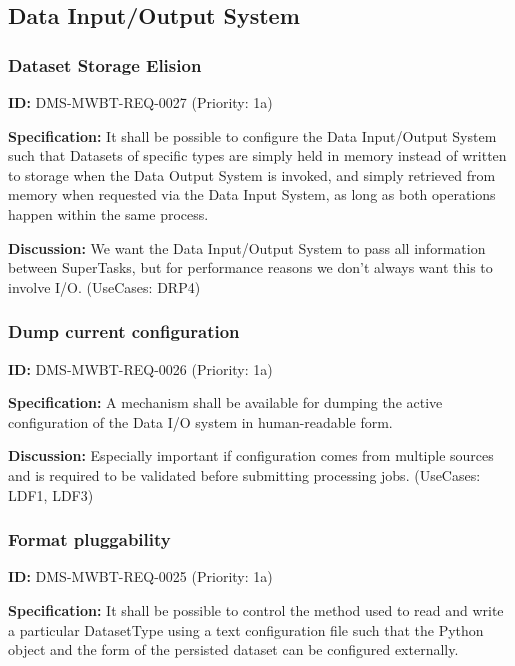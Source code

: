 \documentclass[SE,toc,lsstdraft]{lsstdoc}
\begin{document}
\subsection{Data Input/Output System}

\subsubsection{Dataset Storage Elision}

\label{DMS-MWBT-REQ-0027}
\textbf{ID:} DMS-MWBT-REQ-0027 (Priority: 1a)

\textbf{Specification:}
It shall be possible to configure the Data Input/Output System such that Datasets of specific types are simply held in memory instead of written to storage when the Data Output System is invoked, and simply retrieved from memory when requested via the Data Input System, as long as both operations happen within the same process.

\textbf{Discussion:}
We want the Data Input/Output System to pass all information between SuperTasks, but for performance reasons we don't always want this to involve I/O. (UseCases: DRP4)

\subsubsection{Dump current configuration}

\label{DMS-MWBT-REQ-0026}
\textbf{ID:} DMS-MWBT-REQ-0026 (Priority: 1a)

\textbf{Specification:}
A mechanism shall be available for dumping the active configuration of the Data I/O system in human-readable form.

\textbf{Discussion:}
Especially important if configuration comes from multiple sources and is required to be validated before submitting processing jobs. (UseCases: LDF1, LDF3)

\subsubsection{Format pluggability}

\label{DMS-MWBT-REQ-0025}
\textbf{ID:} DMS-MWBT-REQ-0025 (Priority: 1a)

\textbf{Specification:}
It shall be possible to control the method used to read and write a particular DatasetType using a text configuration file such that the Python object and the form of the persisted dataset can be configured externally.
\end{document}
